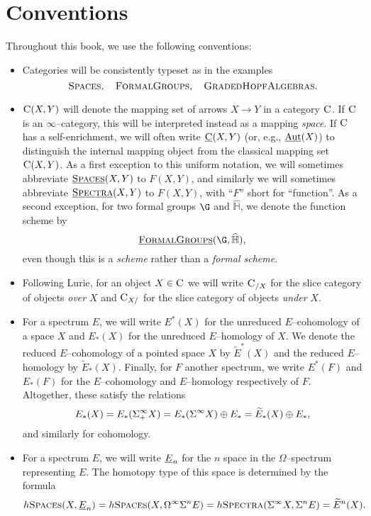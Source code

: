 
\section{Conventions}

Throughout this book, we use the following conventions:

\begin{itemize}
\item Categories will be consistently typeset as in the examples \[\normalfont\textsc{Spaces}, \quad \normalfont\textsc{FormalGroups}, \quad \normalfont\textsc{GradedHopfAlgebras}.\]
\item $\normalfont\textsc{C}(X, Y)$ will denote the mapping set of arrows $X \to Y$ in a category $\normalfont\textsc{C}$.  If $\normalfont\textsc{C}$ is an $\infty$--category, this will be interpreted instead as a mapping \emph{space}.  If $\normalfont\textsc{C}$ has a self-enrichment, we will often write $\underline{\normalfont\textsc{C}}(X, Y)$ (or, e.g., $\operatorname{\underline{\smash{\operatorname{Aut}}}}(X)$) to distinguish the internal mapping object from the classical mapping set $\normalfont\textsc{C}(X, Y)$.  As a first exception to this uniform notation, we will sometimes abbreviate $\underline{\normalfont\textsc{Spaces}}(X, Y)$ to $F(X, Y)$, and similarly we will sometimes abbreviate $\underline{\normalfont\textsc{Spectra}}(X, Y)$ to $F(X, Y)$, with ``$F$'' short for ``function''.  As a second exception, for two formal groups $\G$ and $\widehat{\mathbb H}$, we denote the function scheme by \[\InternalHom{FormalGroups}(\G, \widehat{\mathbb H}),\] even though this is a \emph{scheme} rather than a \emph{formal scheme}.
\item Following Lurie, for an object $X \in \normalfont\textsc{C}$ we will write $\normalfont\textsc{C}_{/X}$ for the slice category of objects \emph{over} $X$ and $\normalfont\textsc{C}_{X/}$ for the slice category of objects \emph{under} $X$.
\item For a spectrum $E$, we will write $E^*(X)$ for the unreduced $E$--cohomology of a space $X$ and $E_*(X)$ for the unreduced $E$--homology of $X$.  We denote the reduced $E$--cohomology of a pointed space $X$ by $\widetilde E^*(X)$ and the reduced $E$--homology by $\widetilde E_*(X)$.  Finally, for $F$ another spectrum, we write $E^*(F)$ and $E_*(F)$ for the $E$--cohomology and $E$--homology respectively of $F$.  Altogether, these satisfy the relations \[E_*(X) = E_*(\Sigma^\infty_+ X) = E_*(\Sigma^\infty X) \oplus E_* = \widetilde E_*(X) \oplus E_*,\] and similarly for cohomology.
\item For a spectrum $E$, we will write $\OS{E}{n}$ for the $n${\th} space in the $\Omega$--spectrum representing $E$.  The homotopy type of this space is determined by the formula \[h\CatOf{Spaces}(X, \OS{E}{n}) = h\CatOf{Spaces}(X, \Loops^\infty \Susp^n E) = h\CatOf{Spectra}(\Susp^\infty X, \Susp^n E) = \widetilde E^n(X).\]

\end{itemize}
